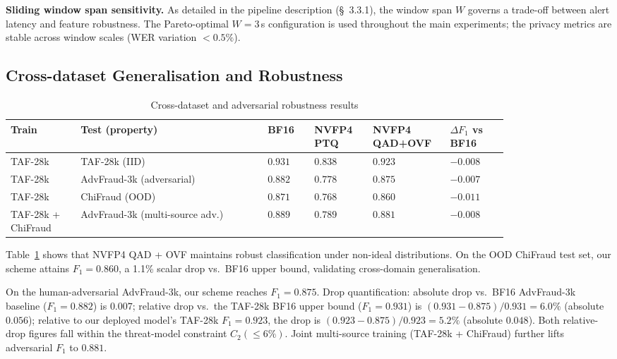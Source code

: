 \documentclass[11pt, a4paper]{article}
\begin{document}
\medskip
\noindent\textbf{Sliding window span sensitivity.} As detailed in the pipeline description (\S~3.3.1), the window span $W$ governs a trade-off between alert latency and feature robustness. The Pareto-optimal $W=3$\,s configuration is used throughout the main experiments; the privacy metrics are stable across window scales (WER variation $<0.5\%$).

\subsection{Cross-dataset Generalisation and Robustness}

\begin{table}[htbp]
\centering
\caption{Cross-dataset and adversarial robustness results}
\label{tab4-en}
\small
\renewcommand{\arraystretch}{1.15}
\begin{tabular}{>{\raggedright\arraybackslash}p{0.12\linewidth}>{\raggedright\arraybackslash}p{0.32\linewidth}>{\centering\arraybackslash}p{0.08\linewidth}>{\centering\arraybackslash}p{0.1\linewidth}>{\centering\arraybackslash}p{0.1\linewidth}>{\centering\arraybackslash}p{0.1\linewidth}}
\toprule
\textbf{Train} & \textbf{Test (property)} & \textbf{BF16} & \textbf{NVFP4 PTQ} & \textbf{NVFP4 QAD+OVF} & \textbf{$\Delta F_1$ vs BF16} \\
\midrule
TAF-28k & TAF-28k (IID) & $0.931$ & $0.838$ & $\mathbf{0.923}$ & $-0.008$ \\
TAF-28k & AdvFraud-3k (adversarial) & $0.882$ & $0.778$ & $\mathbf{0.875}$ & $-0.007$ \\
TAF-28k & ChiFraud (OOD) & $0.871$ & $0.768$ & $\mathbf{0.860}$ & $-0.011$ \\
TAF-28k + ChiFraud & AdvFraud-3k (multi-source adv.) & $0.889$ & $0.789$ & $\mathbf{0.881}$ & $-0.008$ \\
\bottomrule
\end{tabular}
\end{table}

Table~\ref{tab4-en} shows that NVFP4 QAD + OVF maintains robust classification under non-ideal distributions. On the OOD ChiFraud test set, our scheme attains $F_1 = 0.860$, a 1.1\% scalar drop vs.\ BF16 upper bound, validating cross-domain generalisation.

On the human-adversarial AdvFraud-3k, our scheme reaches $F_1 = 0.875$. Drop quantification: absolute drop vs.\ BF16 AdvFraud-3k baseline ($F_1 = 0.882$) is $0.007$; relative drop vs.\ the TAF-28k BF16 upper bound ($F_1 = 0.931$) is $(0.931 - 0.875)/0.931 = 6.0\%$ (absolute $0.056$); relative to our deployed model's TAF-28k $F_1 = 0.923$, the drop is $(0.923 - 0.875)/0.923 = 5.2\%$ (absolute $0.048$). Both relative-drop figures fall within the threat-model constraint $C_2(\le 6\%)$. Joint multi-source training (TAF-28k + ChiFraud) further lifts adversarial $F_1$ to $0.881$.
\end{document}
